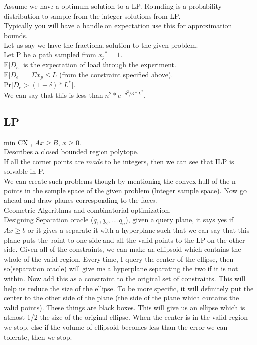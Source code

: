 \documentclass[solution,addpoints,12pt]{exam}
\begin{document}
Assume we have a optimum solution to a LP. Rounding
is a probability distribution to sample from the integer
solutions from LP.\\
Typically you will have a handle on expectation use
this for approximation bounds.\\
Let us say we have the fractional solution to the given problem.\\
Let P be a path sampled from ${x_p}^* = 1$.\\
E[$D_e$] is the expectation of load through the experiment.\\
E[$D_e$] = $\Sigma x_p \le L$ (from the constraint specified above).\\
Pr[$D_e > (1+\delta)*L^*]$.\\
We can say that this is less than $n^2*e^{-\delta^2/3*L^*}$.

\subsection{LP}
min CX , $Ax \ge B$, $x \ge 0$.\\
Describes a closed bounded region polytope.\\
If all the corner points are $made$ to be integers, then we can see that
ILP is solvable in P.\\
We can create such problems though by mentioning the convex hull of
the n points in the sample space of the given problem (Integer sample space).
Now go ahead and draw planes corresponding to the faces.\\
Geometric Algorithms and combinatorial optimization.\\

Designing Separation oracle ($q_1, q_2, .... q_n$), given a query plane, it says
yes if $Ax \ge b$ or it gives a separate it with a hyperplane such that
we can say that this plane puts the point to one side and all the valid
points to the LP on the other side. Given all of the constraints,
we can make an ellipsoid which contains the whole of the valid region.
Every time, I query the center of the ellipse, then so(separation oracle)
will give me a hyperplane separating the two if it is not within.
Now add this as a constraint to the original set of constraints.
This will help us reduce the size of the ellipse.
To be more specific, it will definitely put the
center to the other side of the plane (the side of the plane which contains
the valid points). These things are black boxes. This will give us an ellipse
which is atmost 1/2 the size of the original ellipse. When the
center is in the valid region we stop, else if the volume of ellipsoid
becomes less than the error we can tolerate, then we stop.\\
\end{document}
